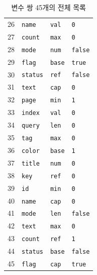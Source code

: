 \begin{table}[t]
\begin{tabular}{rlll}
    26 & \texttt{name} & \texttt{val} & \texttt{0} \\
    27 & \texttt{count} & \texttt{max} & \texttt{0} \\
    28 & \texttt{mode} & \texttt{num} & \texttt{false} \\
    29 & \texttt{flag} & \texttt{base} & \texttt{true} \\
    30 & \texttt{status} & \texttt{ref} & \texttt{false} \\
    31 & \texttt{text} & \texttt{cap} & \texttt{0} \\
    32 & \texttt{page} & \texttt{min} & \texttt{1} \\
    33 & \texttt{index} & \texttt{val} & \texttt{0} \\
    34 & \texttt{query} & \texttt{len} & \texttt{0} \\
    35 & \texttt{tag} & \texttt{max} & \texttt{0} \\
    36 & \texttt{color} & \texttt{base} & \texttt{1} \\
    37 & \texttt{title} & \texttt{num} & \texttt{0} \\
    38 & \texttt{key} & \texttt{ref} & \texttt{0} \\
    39 & \texttt{id} & \texttt{min} & \texttt{0} \\
    40 & \texttt{name} & \texttt{cap} & \texttt{0} \\
    41 & \texttt{mode} & \texttt{len} & \texttt{false} \\
    42 & \texttt{text} & \texttt{max} & \texttt{0} \\
    43 & \texttt{count} & \texttt{ref} & \texttt{1} \\
    44 & \texttt{status} & \texttt{base} & \texttt{false} \\
    45 & \texttt{flag} & \texttt{cap} & \texttt{true} \\
    \bottomrule
  \end{tabular}
  \caption{변수 쌍 45개의 전체 목록}\label{tab:lexical-pairs}
\end{table}

